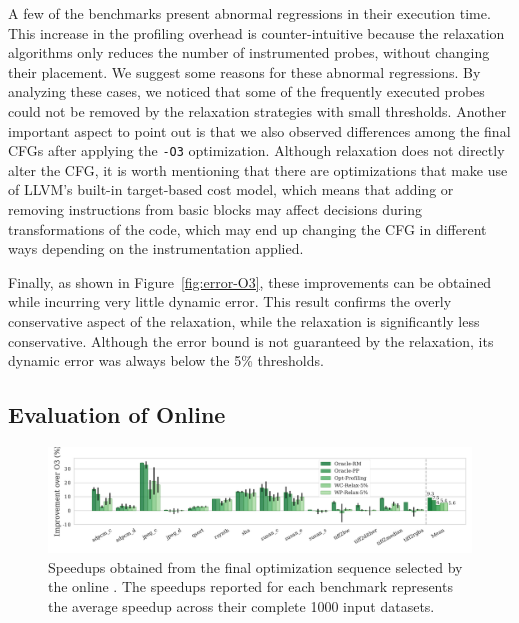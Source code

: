 A few of the benchmarks present abnormal regressions in their execution time.
This increase in the profiling overhead is counter-intuitive because the
relaxation algorithms only reduces the number of instrumented probes,
without changing their placement.
We suggest some reasons for these abnormal regressions.
By analyzing these cases, we noticed that some of the frequently executed
probes could not be removed by the relaxation strategies with small thresholds.
Another important aspect to point out is that we also observed
differences among the final CFGs after applying the \texttt{-O3} optimization.
Although relaxation does not directly alter the CFG, it is worth mentioning that
there are optimizations that make use of LLVM's built-in target-based cost model,
which means that adding or removing instructions from basic blocks may affect
decisions during transformations of the code, which may end up changing the CFG
in different ways depending on the instrumentation applied.

Finally, as shown in Figure~\ref{fig:error-O3}, these improvements can be
obtained while incurring very little dynamic error.
This result confirms the overly conservative aspect of the \WCRelaxLower relaxation,
while the \WPRelaxLower relaxation is significantly less conservative.
Although the error bound is not guaranteed by the \WPRelaxLower relaxation,
its dynamic error was always below the 5\% thresholds.

\subsection{Evaluation of Online {\IterComp}}

\begin{figure}[t]
    \centering
    \includegraphics[width=\textwidth]{figs/speedups.pdf}
    \caption{Speedups obtained from the final optimization sequence selected by the online {\itercomp}.
	         The speedups reported for each benchmark represents the average speedup across their complete 1000 input datasets.}

    \label{fig:speedups}
\end{figure}

